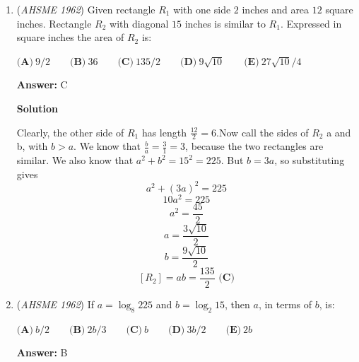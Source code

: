 \begin{enumerate}
Let $CM$ be the median through vertex $C$, and let $G$ be the point of intersection of the triangle's medians. 

 Let $CH$ be the altitude of the triangle through vertex $C$ and $GP$ be the distance from $G$ to $AB$, with the point $P$ laying on $AB$. 

 Using Thales' intercept theorem, we derive the proportion:

 
$\frac{GP}{CH} = \frac{GM}{CM}$

 
The fraction $\frac{GM}{CM}$ in any triangle is equal to $\frac{1}{3}$ . Therefore $GP = \frac{CH}{3}$ . 

 
Since the problem states that the vertex $C$ is moving on a straight line, the length of $CH$ is a constant value. That means that the length of $GP$ is also a constant. Therefore the point $G$ is moving on a straight line.

 Answer: D

 


	\item (\textit{AHSME 1962}) Given rectangle $R_1$ with one side $2$ inches and area $12$ square inches. Rectangle $R_2$ with diagonal $15$ inches is similar to $R_1$. Expressed in square inches the area of $R_2$ is:


 $\textbf{(A)}\ 9/2 \qquad  \textbf{(B)}\ 36 \qquad  \textbf{(C)}\ 135/2 \qquad  \textbf{(D)}\ 9\sqrt{10} \qquad  \textbf{(E)}\ 27\sqrt{10}/4$

 \textbf{Answer: }C



\textbf{Solution}

Clearly, the other side of $R_1$ has length $\frac{12}2=6$.Now call the sides of $R_2$ a and b, with $b>a$. We know that $\frac{b}a=\frac31=3$, because the two rectangles are similar. We also know that $a^2+b^2=15^2=225$. But $b=3a$, so substituting gives 
 \[a^2+(3a)^2=225\]
 \[10a^2=225\]
 \[a^2=\frac{45}2\]
 \[a=\frac{3\sqrt{10}}2\]
 \[b=\frac{9\sqrt{10}}2\]
 \[[R_2]=ab=\boxed{\frac{135}2\textbf{ (C)}}\]



	\item (\textit{AHSME 1962}) If $a = \log_8 225$ and $b = \log_2 15$, then $a$, in terms of $b$, is:


 $\textbf{(A)}\ b/2 \qquad  \textbf{(B)}\ 2b/3 \qquad  \textbf{(C)}\ b \qquad  \textbf{(D)}\ 3b/2 \qquad  \textbf{(E)}\ 2b$

 \textbf{Answer: }B




\end{enumerate}
